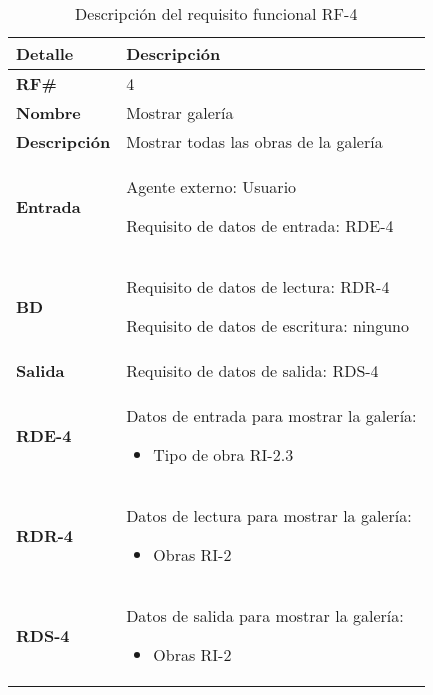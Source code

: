 \begin{table}[H]
    \centering
    \begin{tabular}{|p{3cm}|p{8cm}|}
        \hline
        \rowcolor{lightgray}
        \textbf{Detalle} & \textbf{Descripción} \\
        \hline
        \textbf{RF\#} & 4 \\
        \hline
        \textbf{Nombre} & Mostrar galería \\
        \hline
        \textbf{Descripción} & Mostrar todas las obras de la galería \\
        \hline
        \textbf{Entrada} &
        Agente externo: Usuario
        
        Requisito de datos de entrada: RDE-4 \\
        \hline
        \textbf{BD} &
        Requisito de datos de lectura: RDR-4
        
        Requisito de datos de escritura: ninguno \\
        \hline
        \textbf{Salida} & Requisito de datos de salida: RDS-4 \\
        \hline
        \textbf{RDE-4} & Datos de entrada para mostrar la galería:
            \begin{itemize}
                \item Tipo de obra RI-2.3
            \end{itemize} \\
        \hline
        \textbf{RDR-4} & Datos de lectura para mostrar la galería:
            \begin{itemize}
                \item Obras RI-2
            \end{itemize} \\
        \hline
        \textbf{RDS-4} & Datos de salida para mostrar la galería:
            \begin{itemize}
                \item Obras RI-2
            \end{itemize} \\
        \hline
    \end{tabular}
    \caption{Descripción del requisito funcional RF-4}
    \label{tab:rf-4}
\end{table}

